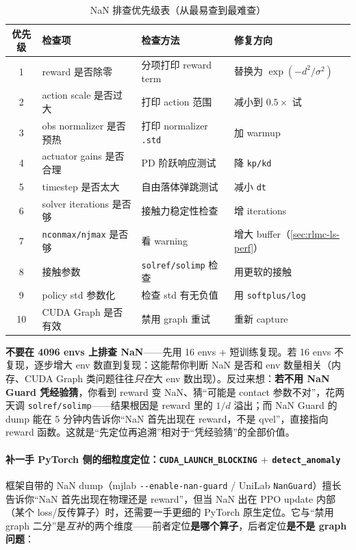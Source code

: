 \begin{table}[H]\centering\small
\caption{NaN 排查优先级表（从最易查到最难查）}
\label{tab:rlmc-ls-nan-priority}
\begin{tabular}{@{}cp{3.4cm}p{3.4cm}p{3.6cm}@{}}
\toprule
优先级 & 检查项 & 检查方法 & 修复方向 \\
\midrule
1 & reward 是否除零 & 分项打印 reward term & 替换为 $\exp(-d^2/\sigma^2)$ \\
2 & action scale 是否过大 & 打印 action 范围 & 减小到 $0.5\times$ 试 \\
3 & obs normalizer 是否预热 & 打印 normalizer \verb|.std| & 加 warmup \\
4 & actuator gains 是否合理 & PD 阶跃响应测试 & 降 \verb|kp/kd| \\
5 & timestep 是否太大 & 自由落体弹跳测试 & 减小 \verb|dt| \\
6 & solver iterations 是否够 & 接触力稳定性检查 & 增 iterations \\
7 & \verb|nconmax/njmax| 是否够 & 看 warning & 增大 buffer（\cref{sec:rlmc-ls-perf}） \\
8 & 接触参数 & \verb|solref/solimp| 检查 & 用更软的接触 \\
9 & policy std 参数化 & 检查 std 有无负值 & 用 \verb|softplus/log| \\
10 & CUDA Graph 是否有效 & 禁用 graph 重试 & 重新 capture \\
\bottomrule
\end{tabular}
\end{table}

\begin{insight}\label{ins:rlmc-ls-nan-shrink}
\textbf{不要在 4096 envs 上排查 NaN}——先用 16 envs + 短训练复现。若 16 envs 不复现，逐步增大 env 数直到复现：这能帮你判断 NaN 是否和 env 数量相关（内存、CUDA Graph 类问题往往\emph{只在}大 env 数出现）。反过来想：\textbf{若不用 NaN Guard 凭经验猜}，你看到 reward 变 NaN、猜“可能是 contact 参数不对”，花两天调 \verb|solref/solimp|——结果根因是 reward 里的 $1/d$ 溢出；而 NaN Guard 的 dump 能在 5 分钟内告诉你“NaN 首先出现在 reward，不是 qvel”，直接指向 reward 函数。这就是“先定位再追溯”相对于“凭经验猜”的全部价值。
\end{insight}

\paragraph{\texorpdfstring{补一手 PyTorch 侧的细粒度定位：\texttt{CUDA\_LAUNCH\_BLOCKING} $+$ \texttt{detect\_anomaly}}{补一手 PyTorch 侧的细粒度定位：CUDA\_LAUNCH\_BLOCKING + detect\_anomaly}}框架自带的 NaN dump（mjlab \verb|--enable-nan-guard| / UniLab \verb|NanGuard|）擅长告诉你“NaN 首先出现在物理还是 reward”，但当 NaN 出在 PPO update 内部（某个 loss/反传算子）时，还需要一手更细的 PyTorch 原生定位。它与“禁用 graph 二分”是\emph{互补}的两个维度——前者定位\textbf{是哪个算子}，后者定位\textbf{是不是 graph 问题}：

